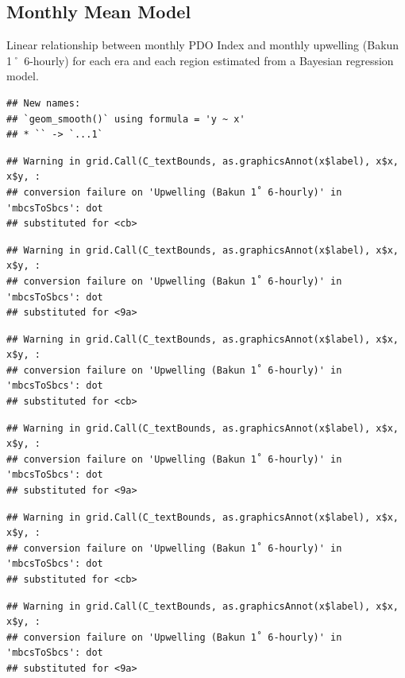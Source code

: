 \documentclass[
]{article}
\begin{document}
\hypertarget{monthly-mean-model}{%
\subsection{Monthly Mean Model}\label{monthly-mean-model}}

Linear relationship between monthly PDO Index and monthly upwelling
(Bakun 1˚ 6-hourly) for each era and each region estimated from a
Bayesian regression model.

\begin{verbatim}
## New names:
## `geom_smooth()` using formula = 'y ~ x'
## * `` -> `...1`
\end{verbatim}

\begin{verbatim}
## Warning in grid.Call(C_textBounds, as.graphicsAnnot(x$label), x$x, x$y, :
## conversion failure on 'Upwelling (Bakun 1˚ 6-hourly)' in 'mbcsToSbcs': dot
## substituted for <cb>
\end{verbatim}

\begin{verbatim}
## Warning in grid.Call(C_textBounds, as.graphicsAnnot(x$label), x$x, x$y, :
## conversion failure on 'Upwelling (Bakun 1˚ 6-hourly)' in 'mbcsToSbcs': dot
## substituted for <9a>
\end{verbatim}

\begin{verbatim}
## Warning in grid.Call(C_textBounds, as.graphicsAnnot(x$label), x$x, x$y, :
## conversion failure on 'Upwelling (Bakun 1˚ 6-hourly)' in 'mbcsToSbcs': dot
## substituted for <cb>
\end{verbatim}

\begin{verbatim}
## Warning in grid.Call(C_textBounds, as.graphicsAnnot(x$label), x$x, x$y, :
## conversion failure on 'Upwelling (Bakun 1˚ 6-hourly)' in 'mbcsToSbcs': dot
## substituted for <9a>
\end{verbatim}

\begin{verbatim}
## Warning in grid.Call(C_textBounds, as.graphicsAnnot(x$label), x$x, x$y, :
## conversion failure on 'Upwelling (Bakun 1˚ 6-hourly)' in 'mbcsToSbcs': dot
## substituted for <cb>
\end{verbatim}

\begin{verbatim}
## Warning in grid.Call(C_textBounds, as.graphicsAnnot(x$label), x$x, x$y, :
## conversion failure on 'Upwelling (Bakun 1˚ 6-hourly)' in 'mbcsToSbcs': dot
## substituted for <9a>
\end{verbatim}
\end{document}
